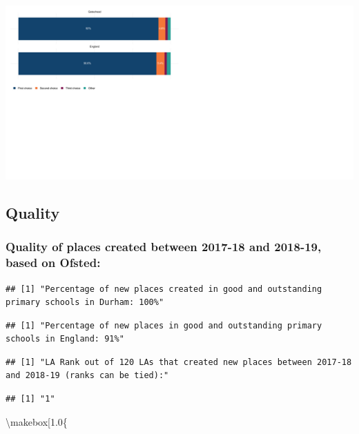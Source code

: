 \documentclass[
]{article}
\begin{document}
\includegraphics[width=1.3\linewidth]{Summary_scorecard_files/figure-latex/preference_barchart-1}

\hypertarget{quality}{%
\subsection{Quality}\label{quality}}

\hypertarget{quality-of-places-created-between-2017-18-and-2018-19-based-on-ofsted}{%
\subsubsection{Quality of places created between 2017-18 and 2018-19,
based on
Ofsted:}\label{quality-of-places-created-between-2017-18-and-2018-19-based-on-ofsted}}

\begin{verbatim}
## [1] "Percentage of new places created in good and outstanding primary schools in Durham: 100%"
\end{verbatim}

\begin{verbatim}
## [1] "Percentage of new places in good and outstanding primary schools in England: 91%"
\end{verbatim}

\begin{verbatim}
## [1] "LA Rank out of 120 LAs that created new places between 2017-18 and 2018-19 (ranks can be tied):"
\end{verbatim}

\begin{verbatim}
## [1] "1"
\end{verbatim}

\textbackslash makebox{[}1.0\linewidth{]}\{ \centering
\end{document}
